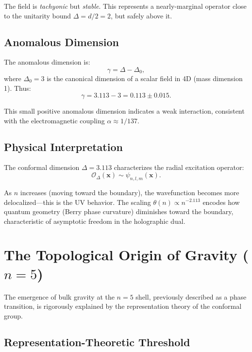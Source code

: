 \documentclass[aps,prd,twocolumn,superscriptaddress,floatfix]{revtex4-2}
\begin{document}
The field is \textit{tachyonic} but \textit{stable}. This represents a nearly-marginal operator close to the unitarity bound $\Delta = d/2 = 2$, but safely above it.

\subsection{Anomalous Dimension}

The anomalous dimension is:
\begin{equation}
\gamma = \Delta - \Delta_0,
\end{equation}
where $\Delta_0 = 3$ is the canonical dimension of a scalar field in 4D (mass dimension 1). Thus:
\begin{equation}
\gamma = 3.113 - 3 = 0.113 \pm 0.015.
\end{equation}

This small positive anomalous dimension indicates a weak interaction, consistent with the electromagnetic coupling $\alpha \approx 1/137$.

\subsection{Physical Interpretation}

The conformal dimension $\Delta = 3.113$ characterizes the radial excitation operator:
\begin{equation}
\mathcal{O}_\Delta(\mathbf{x}) \sim \psi_{n,l,m}(\mathbf{x}).
\end{equation}

As $n$ increases (moving toward the boundary), the wavefunction becomes more delocalized---this is the UV behavior. The scaling $\theta(n) \propto n^{-2.113}$ encodes how quantum geometry (Berry phase curvature) diminishes toward the boundary, characteristic of asymptotic freedom in the holographic dual.


\section{The Topological Origin of Gravity ($n=5$)}

The emergence of bulk gravity at the $n=5$ shell, previously described as a phase transition, is rigorously explained by the representation theory of the conformal group.

\subsection{Representation-Theoretic Threshold}
\end{document}
